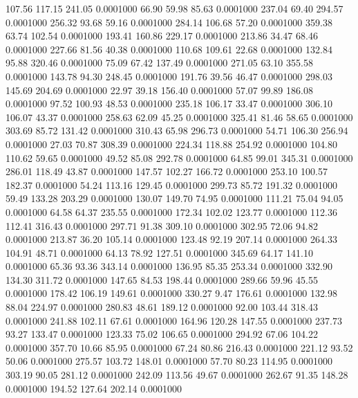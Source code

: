  107.56  117.15  241.05   0.0001000
  66.90   59.98   85.63   0.0001000
 237.04   69.40  294.57   0.0001000
 256.32   93.68   59.16   0.0001000
 284.14  106.68   57.20   0.0001000
 359.38   63.74  102.54   0.0001000
 193.41  160.86  229.17   0.0001000
 213.86   34.47   68.46   0.0001000
 227.66   81.56   40.38   0.0001000
 110.68  109.61   22.68   0.0001000
 132.84   95.88  320.46   0.0001000
  75.09   67.42  137.49   0.0001000
 271.05   63.10  355.58   0.0001000
 143.78   94.30  248.45   0.0001000
 191.76   39.56   46.47   0.0001000
 298.03  145.69  204.69   0.0001000
  22.97   39.18  156.40   0.0001000
  57.07   99.89  186.08   0.0001000
  97.52  100.93   48.53   0.0001000
 235.18  106.17   33.47   0.0001000
 306.10  106.07   43.37   0.0001000
 258.63   62.09   45.25   0.0001000
 325.41   81.46   58.65   0.0001000
 303.69   85.72  131.42   0.0001000
 310.43   65.98  296.73   0.0001000
  54.71  106.30  256.94   0.0001000
  27.03   70.87  308.39   0.0001000
 224.34  118.88  254.92   0.0001000
 104.80  110.62   59.65   0.0001000
  49.52   85.08  292.78   0.0001000
  64.85   99.01  345.31   0.0001000
 286.01  118.49   43.87   0.0001000
 147.57  102.27  166.72   0.0001000
 253.10  100.57  182.37   0.0001000
  54.24  113.16  129.45   0.0001000
 299.73   85.72  191.32   0.0001000
  59.49  133.28  203.29   0.0001000
 130.07  149.70   74.95   0.0001000
 111.21   75.04   94.05   0.0001000
  64.58   64.37  235.55   0.0001000
 172.34  102.02  123.77   0.0001000
 112.36  112.41  316.43   0.0001000
 297.71   91.38  309.10   0.0001000
 302.95   72.06   94.82   0.0001000
 213.87   36.20  105.14   0.0001000
 123.48   92.19  207.14   0.0001000
 264.33  104.91   48.71   0.0001000
  64.13   78.92  127.51   0.0001000
 345.69   64.17  141.10   0.0001000
  65.36   93.36  343.14   0.0001000
 136.95   85.35  253.34   0.0001000
 332.90  134.30  311.72   0.0001000
 147.65   84.53  198.44   0.0001000
 289.66   59.96   45.55   0.0001000
 178.42  106.19  149.61   0.0001000
 330.27    9.47  176.61   0.0001000
 132.98   88.04  224.97   0.0001000
 280.83   48.61  189.12   0.0001000
  92.00  103.44  318.43   0.0001000
 241.88  102.11   67.61   0.0001000
 164.96  120.28  147.55   0.0001000
 237.73   93.27  133.47   0.0001000
 123.33   75.02  106.65   0.0001000
 294.92   67.06  104.22   0.0001000
 357.70   10.66   85.95   0.0001000
  67.24   80.86  216.43   0.0001000
 221.12   93.52   50.06   0.0001000
 275.57  103.72  148.01   0.0001000
  57.70   80.23  114.95   0.0001000
 303.19   90.05  281.12   0.0001000
 242.09  113.56   49.67   0.0001000
 262.67   91.35  148.28   0.0001000
 194.52  127.64  202.14   0.0001000
